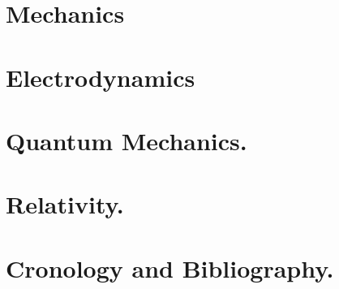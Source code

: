 \documentclass[12pt,leqno]{book}
\begin{document}
\part{Mechanics}












\part{Electrodynamics}



\part{Quantum Mechanics.}












\part{Relativity.}











\part{Cronology and Bibliography.}





\end{document}
